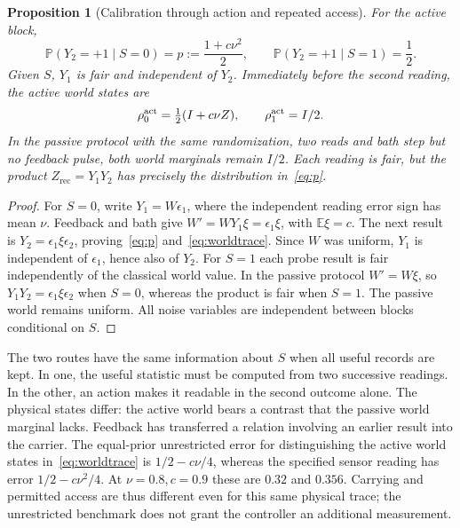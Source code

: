 \documentclass[11pt,a4paper]{article}
\newtheorem{proposition}{Proposition}[section]
\newcommand{\E}{\mathbb E}
\newcommand{\Prb}{\mathbb P}
\begin{document}
\begin{proposition}[Calibration through action and repeated access]\label{prop:pair}
For the active block,
\begin{equation}\label{eq:p}
 \Prb(Y_2=+1\mid S=0)=p:=\frac{1+c\nu^2}{2},\qquad
 \Prb(Y_2=+1\mid S=1)=\frac12.
\end{equation}
Given $S$, $Y_1$ is fair and independent of $Y_2$. Immediately before the second reading, the active world states are
\begin{equation}\label{eq:worldtrace}
 \rho_0^{\rm act}=\tfrac12(I+c\nu Z),\qquad
 \rho_1^{\rm act}=I/2.
\end{equation}
In the passive protocol with the same randomization, two reads and bath step but no feedback pulse, both world marginals remain $I/2$. Each reading is fair, but the product $Z_{\mathrm{rec}}=Y_1Y_2$ has precisely the distribution in~\eqref{eq:p}.
\end{proposition}
\begin{proof}
For $S=0$, write $Y_1=W\epsilon_1$, where the independent reading error sign has mean $\nu$. Feedback and bath give $W'=WY_1\xi=\epsilon_1\xi$, with $\E\xi=c$. The next result is $Y_2=\epsilon_1\xi\epsilon_2$, proving~\eqref{eq:p} and~\eqref{eq:worldtrace}. Since $W$ was uniform, $Y_1$ is independent of $\epsilon_1$, hence also of $Y_2$. For $S=1$ each probe result is fair independently of the classical world value. In the passive protocol $W'=W\xi$, so $Y_1Y_2=\epsilon_1\xi\epsilon_2$ when $S=0$, whereas the product is fair when $S=1$. The passive world remains uniform. All noise variables are independent between blocks conditional on $S$.
\end{proof}

The two routes have the same information about $S$ when all useful records are kept. In one, the useful statistic must be computed from two successive readings. In the other, an action makes it readable in the second outcome alone. The physical states differ: the active world bears a contrast that the passive world marginal lacks. Feedback has transferred a relation involving an earlier result into the carrier. The equal-prior unrestricted error for distinguishing the active world states in~\eqref{eq:worldtrace} is $1/2-c\nu/4$, whereas the specified sensor reading has error $1/2-c\nu^2/4$. At $\nu=0.8,c=0.9$ these are $0.32$ and $0.356$. Carrying and permitted access are thus different even for this same physical trace; the unrestricted benchmark does not grant the controller an additional measurement.
\end{document}
